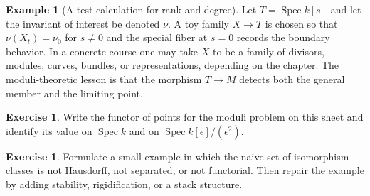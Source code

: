\documentclass[11pt]{amsart}
\theoremstyle{definition}
\newtheorem{example}[theorem]{Example}
\newtheorem{exercise}[theorem]{Exercise}
\newcommand{\Spec}{\operatorname{Spec}}
\begin{document}
\begin{example}[A test calculation for rank and degree]
Let $T=\Spec k[s]$ and let the invariant of interest be denoted $\nu$.  A toy family $X\to T$ is chosen so that $\nu(X_t)=\nu_0$ for $s\ne0$ and the special fiber at $s=0$ records the boundary behavior.  In a concrete course one may take $X$ to be a family of divisors, modules, curves, bundles, or representations, depending on the chapter.  The moduli-theoretic lesson is that the morphism $T\to M$ detects both the general member and the limiting point.
\end{example}
\begin{exercise}
Write the functor of points for the moduli problem on this sheet and identify its value on $\Spec k$ and on $\Spec k[\epsilon]/(\epsilon^2)$.
\end{exercise}
\begin{exercise}
Formulate a small example in which the naive set of isomorphism classes is not Hausdorff, not separated, or not functorial.  Then repair the example by adding stability, rigidification, or a stack structure.
\end{exercise}
\clearpage
\end{document}
